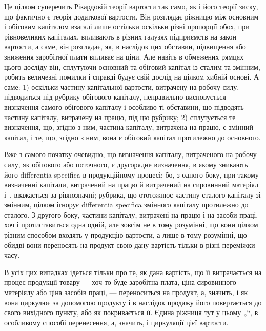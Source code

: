 Це цілком суперечить Рікардовій теорії вартости так само, як і його
теорії зиску, що фактично є теорія додаткової вартости. Він розглядає
ріжницю між основним і обіговим капіталом взагалі лише остільки
оскільки різні пропорції обох, при рівновеликих капіталах, впливають
в різних галузях підприємств на закон вартости, а саме, він розглядає,
як, в наслідок цих обставин, підвищення або зниження заробітної плати
впливає на ціни. Але навіть в обмежених рямцях цього досліду він, сплутуючи
основний та обіговий капітал із сталим та змінним, робить величезні
помилки і справді будує свій дослід на цілком хибній основі. А
саме: 1) оскільки частину капітальної вартости, витрачену на робочу
силу, підводиться під рубрику обігового капіталу, неправильно висновується
визначення самого обігового капіталу і особливо ті обставини,
що підводять частину капіталу, витрачену на працю, під цю рубрику; 2)
сплутується те визначення, що, згідно з ним, частина капіталу, витрачена
на працю, є змінний капітал, і те, що, згідно з ним, вона є обіговий
капітал протилежно до основного.

Вже з самого початку очевидно, що визначення капіталу, витраченого
на робочу силу, як обігового або поточного, є другорядне визначення,
в якому зникають його differentia specifica в продукційному процесі;
бо, з одного боку, при такому визначенні капітали, витрачений на працю
й витрачений на сировинний матеріял і~, вважається за рівнозначні;
рубрика, що ототожнює частину сталого капіталу зі змінним, цілком ігнорує
differentia specifica змінного капіталу протилежно до сталого. З другого
боку, частини капіталу, витрачені на працю і на засоби праці, хоч
і протиставиться одна одній, але зовсім не в тому розумінні, що вони
цілком різним способом входять у продукцію вартости, а лише в тому
розумінні, що обидві вони переносять на продукт свою дану вартість
тільки в різні переміжки часу.

В усіх цих випадках ідеться тільки про те, як дана вартість, що її
витрачається на процес продукції товару — хоч то буде заробітна плата,
ціна сировинного матеріялу або ціна засобів праці, — переноситься на
продукт, а, значить, і як вона циркулює за допомогою продукту і в наслідок
продажу його повертається до свого вихідного пункту, або як
покривається її. Єдина ріжниця тут у цьому „“, в особливому способі
перенесення, а, значить, і циркуляції цієї вартости.

